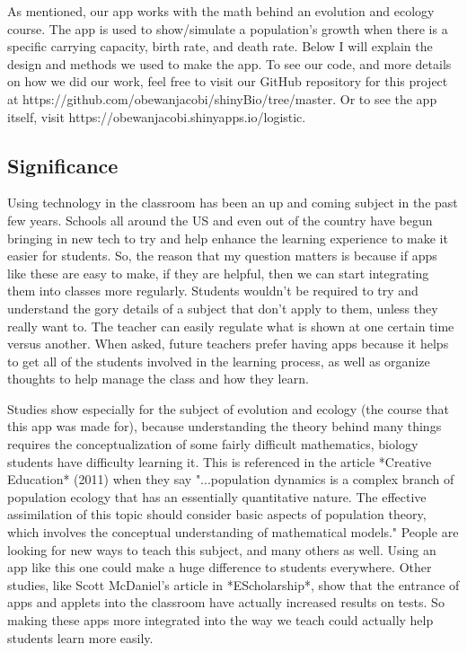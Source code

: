 \documentclass{article}\usepackage[]{graphicx}\usepackage[]{color}
\begin{document}
As mentioned, our app works with the math behind an evolution and ecology course. The app is used to show/simulate a population's growth when there is a specific carrying capacity, birth rate, and death rate. Below I will explain the design and methods we used to make the app. To see our code, and more details on how we did our work, feel free to visit our GitHub repository for this project at https://github.com/obewanjacobi/shinyBio/tree/master. Or to see the app itself, visit https://obewanjacobi.shinyapps.io/logistic.

\subsection{Significance}

Using technology in the classroom has been an up and coming subject in the past few years. Schools all around the US and even out of the country have begun bringing in new tech to try and help enhance the learning experience to make it easier for students. So, the reason that my question matters is because if apps like these are easy to make, if they are helpful, then we can start integrating them into classes more regularly. Students wouldn't be required to try and understand the gory details of a subject that don't apply to them, unless they really want to. The teacher can easily regulate what is shown at one certain time versus another. When asked, future teachers prefer having apps because it helps to get all of the students involved in the learning process, as well as organize thoughts to help manage the class and how they learn.

Studies show especially for the subject of evolution and ecology (the course that this app was made for), because understanding the theory behind many things requires the conceptualization of some fairly difficult mathematics, biology students have difficulty learning it. This is referenced in the article *Creative Education* (2011) when they say "...population dynamics is a complex branch of population ecology that has an essentially quantitative nature. The effective assimilation of this topic should consider basic aspects of population theory, which involves the conceptual understanding of mathematical models." People are looking for new ways to teach this subject, and many others as well. Using an app like this one could make a huge difference to students everywhere. Other studies, like Scott McDaniel's article in *EScholarship*, show that the entrance of apps and applets into the classroom have actually increased results on tests. So making these apps more integrated into the way we teach could actually help students learn more easily.
\end{document}

